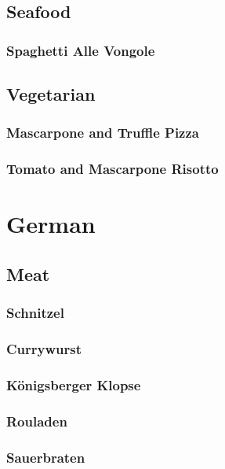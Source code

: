 \documentclass[a4paper, oneside]{book}
\begin{document}
\section{Seafood}

\subsection{Spaghetti Alle Vongole}

\section{Vegetarian}

\subsection{Mascarpone and Truffle Pizza}

\subsection{Tomato and Mascarpone Risotto}

\chapter{German}

\section{Meat}

\subsection{Schnitzel}

\subsection{Currywurst}

\subsection{Königsberger Klopse}

\subsection{Rouladen}

\subsection{Sauerbraten}
\end{document}
